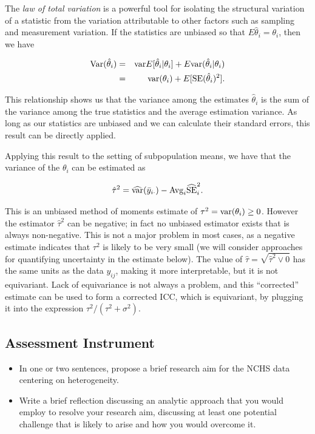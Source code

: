 The {\em law of total variation} is a powerful tool for isolating the structural variation of a statistic from the variation attributable to other factors such as sampling and measurement variation. If the statistics are unbiased so that $E\hat{\theta}_i = \theta_i$, then we have

\begin{eqnarray*}
{\rm Var}(\hat{\theta}_i) &=& {\rm var} E[\hat{\theta}_i | \theta_i] + E {\rm var}(\hat{\theta}_i | \theta_i)\\
&=& {\rm var}(\theta_i) + E[{\rm SE}(\hat{\theta}_i)^2].
\end{eqnarray*}

\noindent This relationship shows us that the variance among the estimates $\hat{\theta}_i$ is the sum of the variance among the true statistics and the average estimation variance. As long as our statistics are unbiased and we can calculate their standard errors, this result can be directly applied.

Applying this result to the setting of subpopulation means, we have that the variance of the $\theta_i$ can be estimated as

$$
\hat{\tau}^2 = \widehat{\rm var}(\bar{y}_{i\cdot}) - {\rm Avg}_i \widehat{\rm SE}_i^2.
$$

\noindent This is an unbiased method of moments estimate of $\tau^2 = {\rm var}(\theta_i) \ge 0$. However the estimator $\hat{\tau}^2$ can be negative; in fact no unbiased estimator exists that is always non-negative. This is not a major problem in most cases, as a negative estimate indicates that $\tau^2$ is likely to be very small (we will consider approaches for quantifying uncertainty in the estimate below). The value of $\hat{\tau} = \sqrt{\hat{\tau}^2 \vee 0}$ has the same units as the data $y_{ij}$, making it more interpretable, but it is not equivariant. Lack of equivariance is not always a problem, and this ``corrected'' estimate can be used to form a corrected ICC, which is equivariant, by plugging it into the expression $\tau^2 / (\tau^2 + \sigma^2)$.

\subsection{Assessment Instrument}

\begin{itemize}
    \item In one or two sentences, propose a brief research aim for the NCHS data centering on heterogeneity.
    \item Write a brief reflection discussing an analytic approach that you would employ to resolve your research aim, discussing at least one potential challenge that is likely to arise and how you would overcome it.
\end{itemize}

